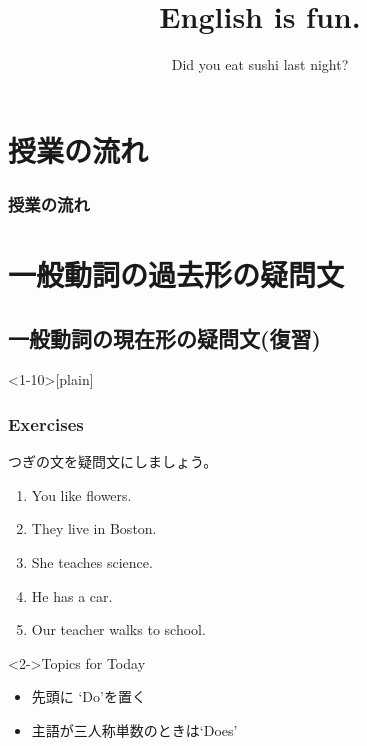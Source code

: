 \documentclass[handout,aspectratio=169,xcolor={dvipsnames,table}]{beamer}
\title{English is fun.}
\subtitle{Did you eat sushi last night?}
\author{}
\institute[]{}
\date[]
\newcommand{\myaudio}[1]{\href{#1}{\faVolumeUp}}
\begin{document}
\begin{frame}[plain]
  \titlepage
\end{frame}

\section*{授業の流れ}
\begin{frame}[plain]
  \frametitle{授業の流れ}
  \tableofcontents
\end{frame}

\section{一般動詞の過去形の疑問文}
\subsection{一般動詞の現在形の疑問文(復習)}
 
\begin{frame}<1-10>[plain]\frametitle{Exercises}

つぎの文を疑問文にしましょう。

 \begin{enumerate}
  \item<1-> You like flowers.\hspace{59.7pt}
  \item<1-> They live in Boston.\hspace{47.5pt}%
  \item<1-> She teaches science.\hspace{42pt}%
  \item<1-> He has  a car.\hspace{80.5pt}%
  \item<1-> Our teacher walks to school.
 \end{enumerate}

\begin{exampleblock}<2->{Topics for Today}
\begin{itemize}\small
 \item<3->   先頭に `Do'を置く\pause
 \item<4->   主語が三人称単数のときは`Does'
\end{itemize}
\end{exampleblock}
\vspace{-10pt}
%
 \mbox{}\hfill\myaudio{./audio/027_past_did_you_01.mp3}

\end{frame}
\end{document}
